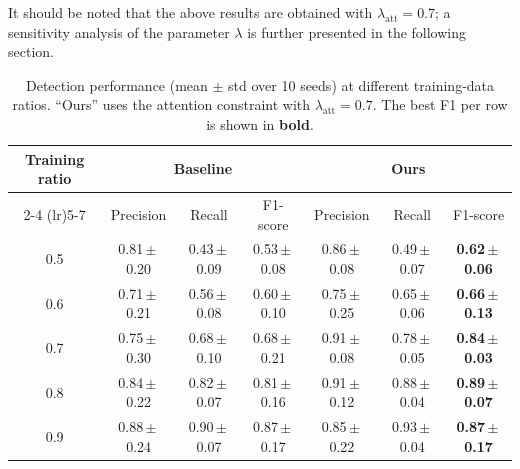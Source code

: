 \documentclass[lettersize,journal]{IEEEtran}
\begin{document}
It should be noted that the above results are obtained with $\lambda_{\mathrm{att}}=0.7$; a sensitivity analysis of the parameter $\lambda$ is further presented in the following section.

\begin{table}[]
\centering
\caption{Detection performance (mean $\pm$ std over 10 seeds) at different
training-data ratios. ``Ours'' uses the attention constraint with
$\lambda_{\mathrm{att}}=0.7$. The best F1 per row is shown in \textbf{bold}.}
\label{tab:bbox_results}
\setlength{\tabcolsep}{4pt}
\renewcommand{\arraystretch}{1.2}
\begin{tabular}{c ccc ccc}
\toprule
\multirow{2}{*}{Training ratio} &
\multicolumn{3}{c}{Baseline} &
\multicolumn{3}{c}{Ours} \\
\cmidrule(lr){2-4} \cmidrule(lr){5-7}
 & Precision & Recall & F1-score
 & Precision & Recall & F1-score \\
\midrule
0.5 & 0.81\,$\pm$\,0.20 & 0.43\,$\pm$\,0.09 & 0.53\,$\pm$\,0.08
    & 0.86\,$\pm$\,0.08 & 0.49\,$\pm$\,0.07 & \textbf{0.62\,$\pm$\,0.06} \\
0.6 & 0.71\,$\pm$\,0.21 & 0.56\,$\pm$\,0.08 & 0.60\,$\pm$\,0.10
    & 0.75\,$\pm$\,0.25 & 0.65\,$\pm$\,0.06 & \textbf{0.66\,$\pm$\,0.13} \\
0.7 & 0.75\,$\pm$\,0.30 & 0.68\,$\pm$\,0.10 & 0.68\,$\pm$\,0.21
    & 0.91\,$\pm$\,0.08 & 0.78\,$\pm$\,0.05 & \textbf{0.84\,$\pm$\,0.03} \\
0.8 & 0.84\,$\pm$\,0.22 & 0.82\,$\pm$\,0.07 & 0.81\,$\pm$\,0.16
    & 0.91\,$\pm$\,0.12 & 0.88\,$\pm$\,0.04 & \textbf{0.89\,$\pm$\,0.07} \\
0.9 & 0.88\,$\pm$\,0.24 & 0.90\,$\pm$\,0.07 & 0.87\,$\pm$\,0.17
    & 0.85\,$\pm$\,0.22 & 0.93\,$\pm$\,0.04 & \textbf{0.87\,$\pm$\,0.17} \\
\bottomrule
\end{tabular}
\end{table}

\end{document}
